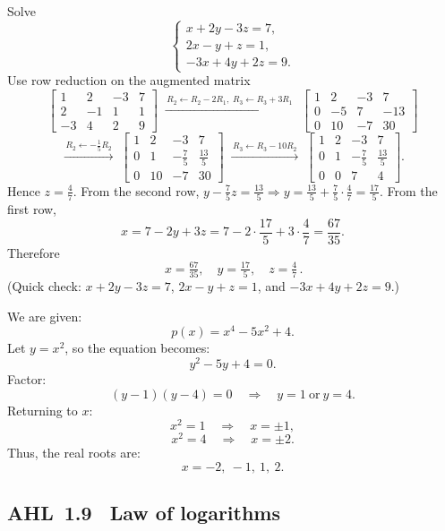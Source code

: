 \documentclass[11pt]{article}
\newcommand{\tocsubsection}[1]{\subsection{#1}}
\begin{document}
\begin{solution}
Solve
\[
\begin{cases}
x+2y-3z=7,\\
2x-y+z=1,\\
-3x+4y+2z=9.
\end{cases}
\]
Use row reduction on the augmented matrix
\[
\left[\begin{array}{ccc|c}
1&2&-3&7\\
2&-1&1&1\\
-3&4&2&9
\end{array}\right]
\;\xrightarrow{\,R_2\leftarrow R_2-2R_1,\; R_3\leftarrow R_3+3R_1\,}\;
\left[\begin{array}{ccc|c}
1&2&-3&7\\
0&-5&7&-13\\
0&10&-7&30
\end{array}\right]
\]
\[
\xrightarrow{\,R_2\leftarrow -\tfrac15 R_2\,}\;
\left[\begin{array}{ccc|c}
1&2&-3&7\\
0&1&-\tfrac{7}{5}&\tfrac{13}{5}\\
0&10&-7&30
\end{array}\right]
\;\xrightarrow{\,R_3\leftarrow R_3-10R_2\,}\;
\left[\begin{array}{ccc|c}
1&2&-3&7\\
0&1&-\tfrac{7}{5}&\tfrac{13}{5}\\
0&0&7&4
\end{array}\right].
\]
Hence \(z=\frac{4}{7}\). From the second row,
\(y-\frac{7}{5}z=\frac{13}{5}\Rightarrow y=\frac{13}{5}+\frac{7}{5}\cdot\frac{4}{7}
=\frac{17}{5}\).
From the first row,
\[
x=7-2y+3z=7-2\cdot\frac{17}{5}+3\cdot\frac{4}{7}
=\frac{67}{35}.
\]
Therefore
\[
\boxed{\,x=\tfrac{67}{35},\quad y=\tfrac{17}{5},\quad z=\tfrac{4}{7}\,}.
\]
(Quick check: \(x+2y-3z=7\), \(2x-y+z=1\), and \(-3x+4y+2z=9\).)
\end{solution}

\begin{solution}
We are given:
\[
p(x) = x^{4} - 5x^{2} + 4.
\]
Let \( y = x^2 \), so the equation becomes:
\[
y^2 - 5y + 4 = 0.
\]
Factor:
\[
(y - 1)(y - 4) = 0 \quad \Rightarrow \quad y = 1 \ \text{or} \ y = 4.
\]
Returning to \( x \):
\[
x^2 = 1 \quad \Rightarrow \quad x = \pm 1,
\]
\[
x^2 = 4 \quad \Rightarrow \quad x = \pm 2.
\]
Thus, the real roots are:
\[
x = -2, \ -1, \ 1, \ 2.
\]
\end{solution}


\tocsubsection{AHL 1.9 \; Law of logarithms}
\end{document}
